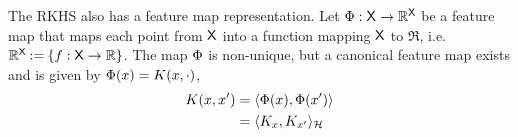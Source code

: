 The RKHS also has a feature map representation. Let $\Phi: {\sf X} \to \mathbb{R}^{\sf X}$ be a feature map that maps each point from ${\sf X}$ into a function mapping ${\sf X}$ to $\Re$, i.e. $\mathbb{R}^{\sf X} \mathbin{:=} \{f: {\sf X} \to \mathbb{R} \}$. The map $\Phi$ is non-unique, but a canonical feature map exists and is given by $\Phi(x)  =  K(x,\cdot)$, %
\begin{equation}
\begin{aligned}
\Kern(x,x') &= \langle \featuremap(x), \featuremap(x')\rangle \\
& = \langle \Kern_x, \Kern_{x'} \rangle_\clH
\end{aligned}
\label{e:rkhs_feature_map}
\end{equation}

%
%

